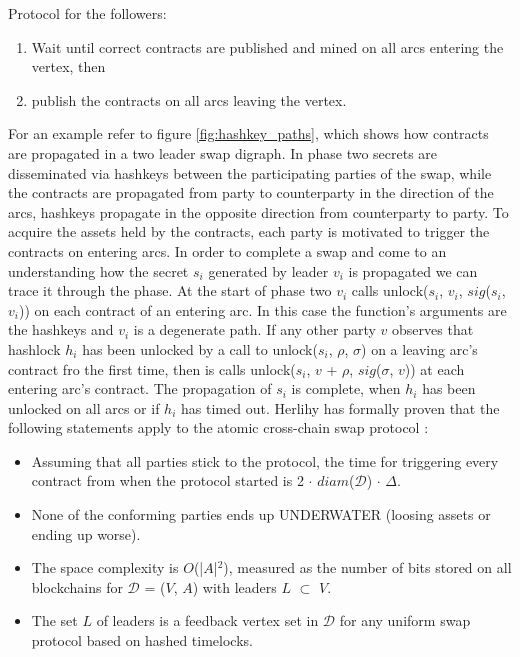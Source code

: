 Protocol for the followers:
\begin{enumerate}
	\item Wait until correct contracts are published and mined on all arcs entering the vertex, then
	\item publish the contracts on all arcs leaving the vertex.
\end{enumerate}

For an example refer to figure \ref{fig:hashkey_paths}, which shows how contracts are propagated in a two leader swap digraph. \newline \newline
In phase two secrets are disseminated via hashkeys between the participating parties of the swap, while the contracts are propagated from party to counterparty in the direction of the arcs, hashkeys propagate in the opposite direction from counterparty to party. To acquire the assets held by the contracts, each party is motivated to trigger the contracts on entering arcs. In order to complete a swap and come to an understanding how the secret $s_i$ generated by leader $v_i$ is propagated we can trace it through the phase. At the start of phase two $v_i$ calls unlock($s_i$, $v_i$, $sig$($s_i$, $v_i$)) on each contract of an entering arc. In this case the function's arguments are the hashkeys and $v_i$ is a degenerate path. If any other party $v$ observes that hashlock $h_i$ has been unlocked by a call to unlock($s_i$, $\rho$, $\sigma$) on a leaving arc's contract fro the first time, then is calls unlock($s_i$, $v$ + $\rho$, $sig$($\sigma$, $v$)) at each entering arc's contract. The propagation of $s_i$ is complete, when $h_i$ has been unlocked on all arcs or if $h_i$ has timed out. Herlihy has formally proven that the following statements apply to the atomic cross-chain swap protocol \cite{herlihy2018atomic}:

\begin{itemize}
	\item Assuming that all parties stick to the protocol, the time for triggering every contract from when the protocol started is 2 $\cdot$ $diam$($\mathcal{D}$) $\cdot$ $\Delta$.
	\item None of the conforming parties ends up UNDERWATER (loosing assets or ending up worse).
	\item The space complexity is $O$(|$A$|$^{2}$), measured as the number of bits stored on all blockchains for $\mathcal{D}$ = ($V$, $A$) with leaders $L$ $\subset$ $V$.
	\item The set $L$ of leaders is a feedback vertex set in $\mathcal{D}$ for any uniform swap protocol based on hashed timelocks.
\end{itemize}

